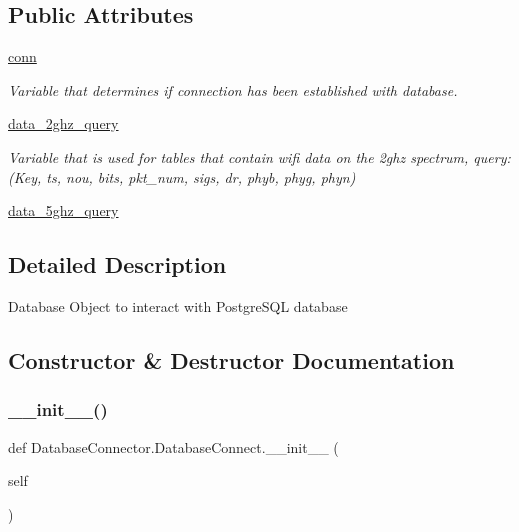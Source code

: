 \subsection*{Public Attributes}
\begin{DoxyCompactItemize}
\item 
\mbox{\hyperlink{classDatabaseConnector_1_1DatabaseConnect_a032674c05648a8ba31c2ef9a1363338e}{conn}}
\begin{DoxyCompactList}\small\item\em Variable that determines if connection has been established with database. \end{DoxyCompactList}\item 
\mbox{\hyperlink{classDatabaseConnector_1_1DatabaseConnect_aa3b98ea56e1017172f5cee5e2369e667}{data\+\_\+2ghz\+\_\+query}}
\begin{DoxyCompactList}\small\item\em Variable that is used for tables that contain wifi data on the 2ghz spectrum, query\+: (Key, ts, nou, bits, pkt\+\_\+num, sigs, dr, phyb, phyg, phyn) \end{DoxyCompactList}\item 
\mbox{\hyperlink{classDatabaseConnector_1_1DatabaseConnect_a7dc062c3656c29ff946228c951c39254}{data\+\_\+5ghz\+\_\+query}}
\end{DoxyCompactItemize}


\subsection{Detailed Description}
\begin{DoxyVerb}Database Object to interact with PostgreSQL database\end{DoxyVerb}
 

\subsection{Constructor \& Destructor Documentation}
\mbox{\label{classDatabaseConnector_1_1DatabaseConnect_adafc2b78cab3df24b9f1f88990f88ac7}} 
\subsubsection{\texorpdfstring{\+\_\+\+\_\+init\+\_\+\+\_\+()}{\_\_init\_\_()}}
{\footnotesize\ttfamily def Database\+Connector.\+Database\+Connect.\+\_\+\+\_\+init\+\_\+\+\_\+ (\begin{DoxyParamCaption}\item[{}]{self }\end{DoxyParamCaption})}

